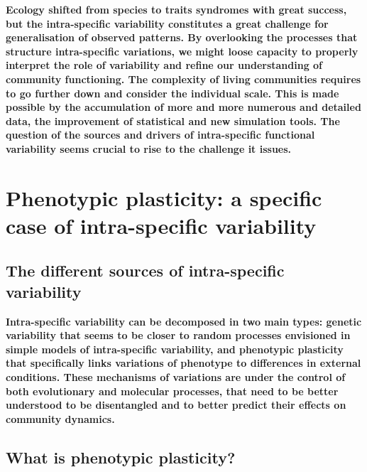 \textbf{%
Ecology shifted from species to traits syndromes with great success, but the intra-specific variability constitutes a great challenge for generalisation of observed patterns. By overlooking the processes that structure intra-specific variations, we might loose capacity to properly interpret the role of variability and refine our understanding of community functioning. The complexity of living communities requires to go further down and consider the individual scale. This is made possible by the accumulation of more and more numerous and detailed data, the improvement of statistical and new simulation tools. The question of the sources and drivers of intra-specific functional variability seems crucial to rise to the challenge it issues.}



\section{Phenotypic plasticity: a specific case of intra-specific variability}

\subsection{The different sources of intra-specific variability}


\textbf{Intra-specific variability can be decomposed in two main types: genetic variability that seems to be closer to random processes envisioned in simple models of intra-specific variability, and phenotypic plasticity that specifically links variations of phenotype to differences in external conditions. These mechanisms of variations are under the control of both evolutionary and molecular processes, that need to be better understood to be disentangled and to better predict their effects on community dynamics.}

\subsection{What is phenotypic plasticity?}

